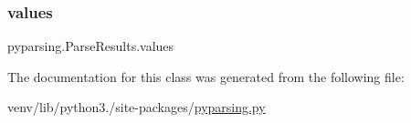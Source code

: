 \mbox{\label{classpyparsing_1_1ParseResults_a19f1847e3d7b1d2f464e04f1d38e5f0d}} 
\subsubsection{\texorpdfstring{values}{values}}
{\footnotesize\ttfamily pyparsing.\+Parse\+Results.\+values\hspace{0.3cm}{\ttfamily [static]}}



The documentation for this class was generated from the following file\+:\begin{DoxyCompactItemize}
\item 
venv/lib/python3./site-\/packages/\hyperlink{pyparsing_8py}{pyparsing.\+py}\end{DoxyCompactItemize}
